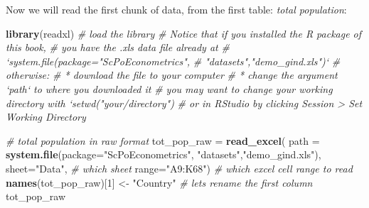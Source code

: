 \documentclass[]{book}
\newenvironment{Shaded}{\begin{snugshade}}{\end{snugshade}}
\newcommand{\CommentTok}[1]{\textcolor[rgb]{0.56,0.35,0.01}{\textit{#1}}}
\newcommand{\DataTypeTok}[1]{\textcolor[rgb]{0.13,0.29,0.53}{#1}}
\newcommand{\DecValTok}[1]{\textcolor[rgb]{0.00,0.00,0.81}{#1}}
\newcommand{\KeywordTok}[1]{\textcolor[rgb]{0.13,0.29,0.53}{\textbf{#1}}}
\newcommand{\NormalTok}[1]{#1}
\newcommand{\StringTok}[1]{\textcolor[rgb]{0.31,0.60,0.02}{#1}}
\begin{document}
Now we will read the first chunk of data, from the first table: \emph{total population}:

\begin{Shaded}
\begin{Highlighting}[]
\KeywordTok{library}\NormalTok{(readxl)  }\CommentTok{# load the library}
\CommentTok{# Notice that if you installed the R package of this book,}
\CommentTok{# you have the .xls data file already at }
\CommentTok{# `system.file(package="ScPoEconometrics",}
\CommentTok{#                        "datasets","demo_gind.xls")`}
\CommentTok{# otherwise:}
\CommentTok{# * download the file to your computer}
\CommentTok{# * change the argument `path` to where you downloaded it}
\CommentTok{# you may want to change your working directory with `setwd("your/directory")}
\CommentTok{# or in RStudio by clicking Session > Set Working Directory}

\CommentTok{# total population in raw format}
\NormalTok{tot_pop_raw =}\StringTok{ }\KeywordTok{read_excel}\NormalTok{(}
                \DataTypeTok{path =} \KeywordTok{system.file}\NormalTok{(}\DataTypeTok{package=}\StringTok{"ScPoEconometrics"}\NormalTok{,}
                                    \StringTok{"datasets"}\NormalTok{,}\StringTok{"demo_gind.xls"}\NormalTok{), }
                \DataTypeTok{sheet=}\StringTok{"Data"}\NormalTok{, }\CommentTok{# which sheet}
                \DataTypeTok{range=}\StringTok{"A9:K68"}\NormalTok{)  }\CommentTok{# which excel cell range to read}
\KeywordTok{names}\NormalTok{(tot_pop_raw)[}\DecValTok{1}\NormalTok{] <-}\StringTok{ "Country"}   \CommentTok{# lets rename the first column}
\NormalTok{tot_pop_raw}
\end{Highlighting}
\end{Shaded}
\end{document}
